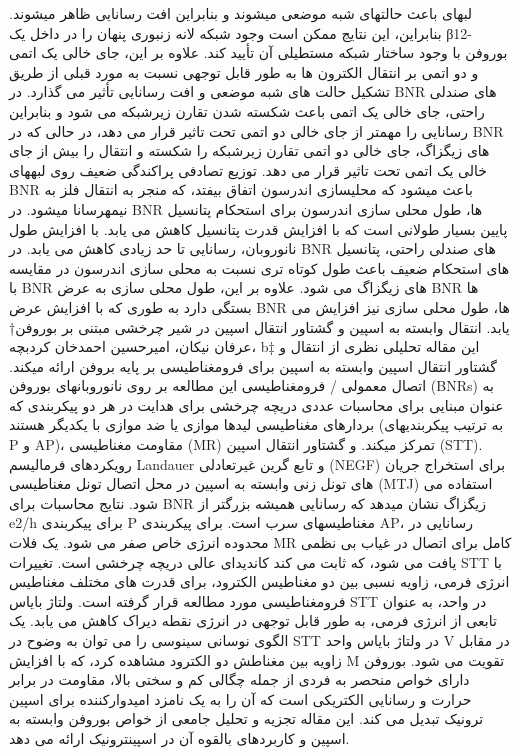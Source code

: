 لبهای باعث حالتهای شبه موضعی میشوند و بنابراین افت رسانایی ظاهر میشوند. بنابراین، این نتایج ممکن است وجود شبکه لانه زنبوری پنهان را در داخل یک β12-بوروفن با وجود ساختار شبکه مستطیلی آن تأیید کند. علاوه بر این، جای خالی یک اتمی و دو اتمی بر انتقال الکترون ها به طور قابل توجهی نسبت به مورد قبلی از طریق تشکیل حالت های شبه موضعی و افت رسانایی تأثیر می گذارد. در BNR های صندلی راحتی، جای خالی یک اتمی باعث شکسته شدن تقارن زیرشبکه می شود و بنابراین رسانایی را مهمتر از جای خالی دو اتمی تحت تاثیر قرار می دهد، در حالی که در BNR های زیگزاگ، جای خالی دو اتمی تقارن زیرشبکه را شکسته و انتقال را بیش از جای خالی یک اتمی تحت تاثیر قرار می دهد. توزیع تصادفی پراکندگی ضعیف روی لبههای BNR باعث میشود که محلیسازی اندرسون اتفاق بیفتد، که منجر به انتقال فلز به نیمهرسانا میشود. در BNR ها، طول محلی سازی اندرسون برای استحکام پتانسیل پایین بسیار طولانی است که با افزایش قدرت پتانسیل کاهش می یابد. با افزایش طول نانوروبان، رسانایی تا حد زیادی کاهش می یابد. در BNR های صندلی راحتی، پتانسیل های استحکام ضعیف باعث طول کوتاه تری نسبت به محلی سازی اندرسون در مقایسه با BNR های زیگزاگ می شود. علاوه بر این، طول محلی سازی به عرض BNR ها بستگی دارد به طوری که با افزایش عرض BNR ها، طول محلی سازی نیز افزایش می یابد.
انتقال وابسته به اسپین و گشتاور انتقال اسپین در شیر چرخشی مبتنی بر بوروفن† عرفان نیکان، امیرحسین احمدخان کردبچه، b‡ این مقاله تحلیلی نظری از انتقال و گشتاور انتقال اسپین وابسته به اسپین برای فرومغناطیسی بر پایه بروفن ارائه میکند. اتصال معمولی / فرومغناطیسی این مطالعه بر روی نانوروبانهای بوروفن (BNRs) به عنوان مبنایی برای محاسبات عددی دریچه چرخشی برای هدایت در هر دو پیکربندی که بردارهای مغناطیسی لیدها موازی یا ضد موازی با یکدیگر هستند (به ترتیب پیکربندیهای P و AP)، مقاومت مغناطیسی (MR) تمرکز میکند. و گشتاور انتقال اسپین (STT). رویکردهای فرمالیسم Landauer و تابع گرین غیرتعادلی (NEGF) برای استخراج جریان های تونل زنی وابسته به اسپین در محل اتصال تونل مغناطیسی (MTJ) استفاده می شود. نتایج محاسبات برای BNR زیگزاگ نشان میدهد که رسانایی همیشه بزرگتر از e2/h برای پیکربندی P مغناطیسهای سرب است. برای پیکربندی AP، رسانایی در محدوده انرژی خاص صفر می شود. یک فلات MR کامل برای اتصال در غیاب بی نظمی یافت می شود، که ثابت می کند کاندیدای عالی دریچه چرخشی است. تغییرات STT با انرژی فرمی، زاویه نسبی بین دو مغناطیس الکترود، برای قدرت های مختلف مغناطیس فرومغناطیسی مورد مطالعه قرار گرفته است. ولتاژ بایاس STT در واحد، به عنوان تابعی از انرژی فرمی، به طور قابل توجهی در انرژی نقطه دیراک کاهش می یابد. یک الگوی نوسانی سینوسی را می توان به وضوح در STT در ولتاژ بایاس واحد V در مقابل زاویه بین مغناطش دو الکترود مشاهده کرد، که با افزایش M تقویت می شود. بوروفن دارای خواص منحصر به فردی از جمله چگالی کم و سختی بالا، مقاومت در برابر حرارت و رسانایی الکتریکی است که آن را به یک نامزد امیدوارکننده برای اسپین ترونیک تبدیل می کند. این مقاله تجزیه و تحلیل جامعی از خواص بوروفن وابسته به اسپین و کاربردهای بالقوه آن در اسپینترونیک ارائه می دهد.
